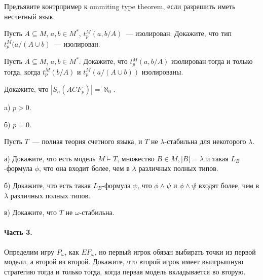 \begin{task}
    Предъявите контрпример к ommiting type theorem, если разрешить иметь несчетный
    язык.
\end{task}

\begin{task}
    Пусть $A \subseteq M$, $a, b \in M^{*}$, $t_p^M(a, b / A)$~---
    изолирован. Докажите, что тип $t_p^M(a / (A \cup {b})$~--- изолирован.
\end{task}

\begin{task}
     Пусть $A \subseteq M$, $a, b \in M^{*}$. Докажите, что $t_p^M(a, b / A)$
     изолирован тогда и только тогда, когда $t_p^M(b / A)$ и $t_p^M(a / (A \cup
     {b}))$ изолированы.
\end{task}

\begin{task}
    Докажите, что $|S_n(ACF_p)| = \aleph_0$.

    a) $p > 0$.

    б) $p = 0$.
\end{task}

\begin{task}{19}
    Пусть $T$~--- полная теория счетного языка, и $T$ не $\lambda$-стабильна для
    некоторого $\lambda$.

	а) Докажите, что есть модель $M \models T$, множество $B \in M, |B| = \lambda$
    и такая $L_B$-формула $\phi$, что она входит более, чем в $\lambda$ различных
    полных типов.

    б) Докажите, что есть такая $L_B$-формула $\psi$, что $\phi \land \psi$ и $\phi
    \land \not \psi$ входят более, чем в $\lambda$ различных полных типов.


    в) Докажите, что $T$ не $\omega$-стабильна.
\end{task}


\breakline

\paragraph{Часть 3.}

\begin{task}
    Определим игру $P_{\omega}$, как $EF_{\omega}$, но первый игрок обязан выбирать
    точки из первой модели, а второй из второй. Докажите, что второй игрок имеет
    выигрышную стратегию тогда и только тогда, когда первая модель вкладывается во
    вторую. 
\end{task}
